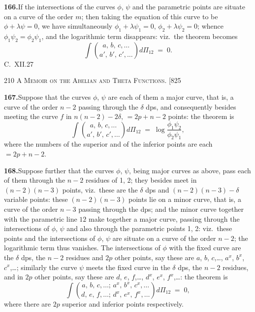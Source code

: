 \documentclass[11pt]{article}
\begin{document}
\medskip
\textbf{166.}\quad If the intersections of the curves $\phi$, $\psi$ and the parametric points are
situate on a curve of the order $m$; then taking the equation of this curve to be
$\phi+\lambda\psi = 0$, we have simultaneously $\phi_{1}+\lambda\psi_{1}=0$, $\phi_{2}+\lambda\psi_{2}=0$; whence $\phi_{1}\psi_{2}=\phi_{2}\psi_{1}$, and
the logarithmic term disappears: viz.\ the theorem becomes
\[
\int\!\binom{a,\,b,\,c,\ldots}{a',\,b',\,c',\ldots}d\Pi_{12} \;=\; 0.
\]
\smallskip
\hfill C.~XII.\hfill 27

\newpage
\noindent\textsc{210 \hfill A Memoir on the Abelian and Theta Functions. \hfill [825}
\vspace{0.6em}

\noindent
\textbf{167.}\quad Suppose that the curves $\phi$, $\psi$ are each of them a major curve, that is, a
curve of the order $n-2$ passing through the $\delta$ dps, and consequently besides meeting
the curve $f$ in $n(n-2)-2\delta$, $=2p+n-2$ points: the theorem is
\[
\int\!\binom{a,\,b,\,c,\ldots}{a',\,b',\,c',\ldots}d\Pi_{12} \;=\; \log\frac{\phi_{1}\psi_{2}}{\phi_{2}\psi_{1}},
\]
where the numbers of the superior and of the inferior points are each $=2p+n-2$.

\medskip
\textbf{168.}\quad Suppose further that the curves $\phi$, $\psi$, being major curves as above, pass
each of them through the $n-2$ residues of 1, 2; they besides meet in $(n-2)(n-3)$
points, viz.\ these are the $\delta$ dps and $(n-2)(n-3)-\delta$ variable points: these $(n-2)(n-3)$
points lie on a minor curve, that is, a curve of the order $n-3$ passing through the
dps; and the minor curve together with the parametric line $12$ make together a
major curve, passing through the intersections of $\phi$, $\psi$ and also through the parametric
points 1, 2: viz.\ these points and the intersections of $\phi$, $\psi$ are situate on a curve of
the order $n-2$; the logarithmic term thus vanishes.  The intersections of $\phi$ with the
fixed curve are the $\delta$ dps, the $n-2$ residues and $2p$ other points, say these are
$a$, $b$, $c$,\ldots, $a^{x}$, $b^{x}$, $c^{x}$,\ldots; similarly the curve $\psi$ meets the fixed curve in the $\delta$ dps, the
$n-2$ residues, and in $2p$ other points, say these are $d$, $e$, $f$,\ldots, $d^{x}$, $e^{x}$, $f^{x}$,\ldots: the
theorem is
\[
\int\!\binom{a,\,b,\,c,\ldots;\,a^{x},\,b^{x},\,c^{x},\ldots}{d,\,e,\,f,\ldots;\,d^{x},\,e^{x},\,f^{x},\ldots}d\Pi_{12} \;=\; 0,
\]
where there are $2p$ superior and inferior points respectively.
\end{document}
